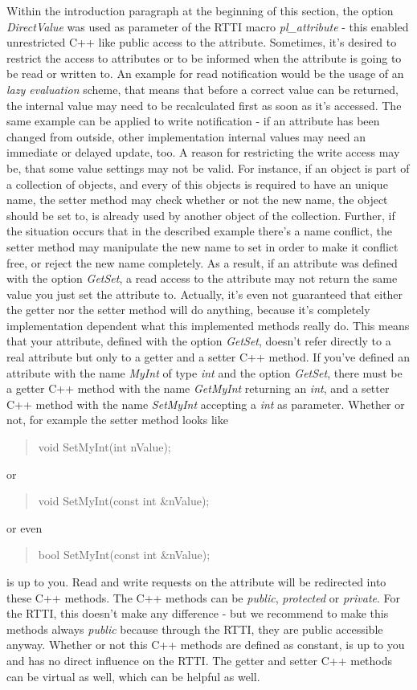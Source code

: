 Within the introduction paragraph at the beginning of this section, the option \emph{DirectValue} was used as parameter of the RTTI macro \emph{pl\_attribute} - this enabled unrestricted C++ like public access to the attribute. Sometimes, it's desired to restrict the access to attributes or to be informed when the attribute is going to be read or written to. An example for read notification would be the usage of an \emph{lazy evaluation} scheme, that means that before a correct value can be returned, the internal value may need to be recalculated first as soon as it's accessed. The same example can be applied to write notification - if an attribute has been changed from outside, other implementation internal values may need an immediate or delayed update, too. A reason for restricting the write access may be, that some value settings may not be valid. For instance, if an object is part of a collection of objects, and every of this objects is required to have an unique name, the setter method may check whether or not the new name, the object should be set to, is already used by another object of the collection. Further, if the situation occurs that in the described example there's a name conflict, the setter method may manipulate the new name to set in order to make it conflict free, or reject the new name completely. As a result, if an attribute was defined with the option \emph{GetSet}, a read access to the attribute may not return the same value you just set the attribute to. Actually, it's even not guaranteed that either the getter nor the setter method will do anything, because it's completely implementation dependent what this implemented methods really do. This means that your attribute, defined with the option \emph{GetSet}, doesn't refer directly to a real attribute but only to a getter and a setter C++ method. If you've defined an attribute with the name \emph{MyInt} of type \emph{int} and the option \emph{GetSet}, there must be a getter C++ method with the name \emph{GetMyInt} returning an \emph{int}, and a setter C++ method with the name \emph{SetMyInt} accepting a \emph{int} as parameter. Whether or not, for example the setter method looks like \begin{quote}void SetMyInt(int nValue);\end{quote} or \begin{quote}void SetMyInt(const int \&nValue);\end{quote} or even \begin{quote}bool SetMyInt(const int \&nValue);\end{quote} is up to you. Read and write requests on the attribute will be redirected into these C++ methods. The C++ methods can be \emph{public}, \emph{protected} or \emph{private}. For the RTTI, this doesn't make any difference - but we recommend to make this methods always \emph{public} because through the RTTI, they are public accessible anyway. Whether or not this C++ methods are defined as constant, is up to you and has no direct influence on the RTTI. The getter and setter C++ methods can be virtual as well, which can be helpful as well.

